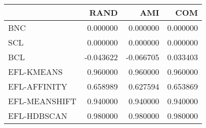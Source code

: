 \begin{tabular}{lrrr}
\toprule
 & RAND & AMI & COM \\
\midrule
BNC & 0.000000 & 0.000000 & 0.000000 \\
SCL & 0.000000 & 0.000000 & 0.000000 \\
BCL & -0.043622 & -0.066705 & 0.033403 \\
EFL-KMEANS & 0.960000 & 0.960000 & 0.960000 \\
EFL-AFFINITY & 0.658989 & 0.627594 & 0.653869 \\
EFL-MEANSHIFT & 0.940000 & 0.940000 & 0.940000 \\
EFL-HDBSCAN & 0.980000 & 0.980000 & 0.980000 \\
\bottomrule
\end{tabular}
